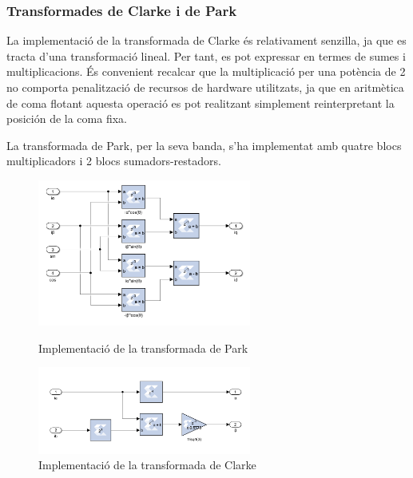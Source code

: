 {    \subsubsection{ Transformades de Clarke i de Park }
    { 
        La implementació de la transformada de Clarke és relativament senzilla,
        ja que es tracta d'una transformació lineal. Per tant, es pot expressar
        en termes de sumes i multiplicacions. És convenient recalcar que la
        multiplicació per una potència de 2 no comporta penalització de
        recursos de hardware utilitzats, ja que en aritmètica de coma flotant
        aquesta operació es pot realitzant simplement reinterpretant la
        posición de la coma fixa.

        La transformada de Park, per la seva banda, s'ha implementat amb quatre
        blocs multiplicadors i 2 blocs sumadors-restadors.

        \begin{figure}[!htb]
            \centering
            \begin{minipage}[c]{7cm}
                \centering
                \captionsetup{justification=centering}
                \includegraphics[width=7cm]
                    { img/4_implementacio/park.png }
                \caption{ Implementació de la transformada de Park }        
            \end{minipage} \hfil
            \begin{minipage}[c]{7cm}
                \centering
                \captionsetup{justification=centering}
                \includegraphics[width=7cm]
                    { img/4_implementacio/clarke.png }
                \caption{ Implementació de la transformada de Clarke }           
            \end{minipage} \hfil
        \end{figure} 
    }

}
